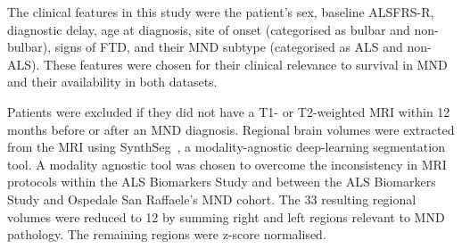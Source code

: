 The clinical features in this study were the patient's sex, baseline ALSFRS-R, diagnostic delay, age at diagnosis, site of onset (categorised as bulbar and non-bulbar), signs of FTD, and their MND subtype (categorised as ALS and non-ALS).
These features were chosen for their clinical relevance to survival in MND and their availability in both datasets.

Patients were excluded if they did not have a T1- or T2-weighted MRI within 12 months before or after an MND diagnosis.
Regional brain volumes were extracted from the MRI using SynthSeg~\cite{billotSynthSegDomainRandomisation2021}, a modality-agnostic deep-learning segmentation tool.
A modality agnostic tool was chosen to overcome the inconsistency in MRI protocols within the ALS Biomarkers Study and between the ALS Biomarkers Study and Ospedale San Raffaele's MND cohort.
The 33 resulting regional volumes were reduced to 12 by summing right and left regions relevant to MND pathology.
The remaining regions were z-score normalised.


